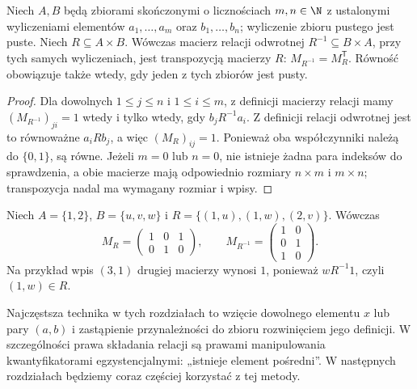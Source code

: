 \begin{twierdzenie}\label{thm:lxiv-relation-matrix-transpose}
Niech $A,B$ będą zbiorami skończonymi o licznościach
$m,n\in\N$ z ustalonymi wyliczeniami elementów
$a_1,\ldots,a_m$ oraz $b_1,\ldots,b_n$;
wyliczenie zbioru pustego jest puste.
Niech $R\subseteq A\times B$. Wówczas macierz relacji
odwrotnej $R^{-1}\subseteq B\times A$, przy tych samych
wyliczeniach, jest transpozycją macierzy $R$:
$M_{R^{-1}}=M_R^{\mathsf T}$. Równość obowiązuje także
wtedy, gdy jeden z tych zbiorów jest pusty.
\end{twierdzenie}
\begin{proof}
Dla dowolnych $1\le j\le n$ i $1\le i\le m$,
z definicji macierzy relacji mamy
$(M_{R^{-1}})_{ji}=1$ wtedy i tylko wtedy, gdy
$b_jR^{-1}a_i$. Z definicji relacji odwrotnej jest to
równoważne $a_iRb_j$, a więc $(M_R)_{ij}=1$.
Ponieważ oba współczynniki należą do $\{0,1\}$,
są równe. Jeżeli $m=0$ lub $n=0$, nie istnieje
żadna para indeksów do sprawdzenia, a obie macierze
mają odpowiednio rozmiary $n\times m$ i $m\times n$;
transpozycja nadal ma wymagany rozmiar i wpisy.
\end{proof}
\begin{przyklad}\label{ex:lxiv-relation-matrix-transpose}
Niech $A=\{1,2\}$, $B=\{u,v,w\}$ i
$R=\{(1,u),(1,w),(2,v)\}$. Wówczas
\[
M_R=\begin{pmatrix}1&0&1\\0&1&0\end{pmatrix},\qquad
M_{R^{-1}}=\begin{pmatrix}1&0\\0&1\\1&0\end{pmatrix}.
\]
Na przykład wpis $(3,1)$ drugiej macierzy wynosi $1$,
ponieważ $wR^{-1}1$, czyli $(1,w)\in R$.
\end{przyklad}

\begin{uwaga}
Najczęstsza technika w tych rozdziałach to wzięcie
dowolnego elementu $x$ lub pary $(a,b)$ i zastąpienie
przynależności do zbioru rozwinięciem jego definicji.
W szczególności prawa składania relacji są prawami
manipulowania kwantyfikatorami egzystencjalnymi:
„istnieje element pośredni”. W następnych rozdziałach
będziemy coraz częściej korzystać z tej metody.
\end{uwaga}
